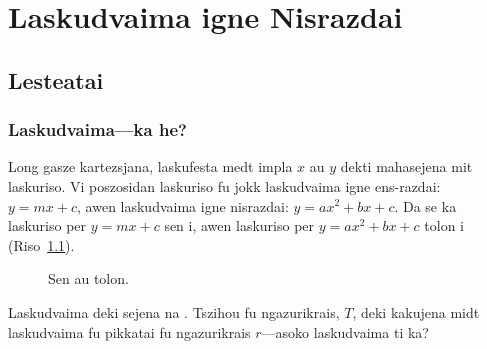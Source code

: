 \chapter{Laskudvaima igne Nisrazdai}

\section{Lesteatai}

\subsection{Laskudvaima---ka he?}

Long gasze kartezsjana, laskufesta medt impla \(x\) au \(y\) dekti mahasejena mit laskuriso.
Vi poszosidan laskuriso fu jokk laskudvaima igne ens-razdai: \(y = mx + c\), awen laskudvaima igne
nisrazdai: \(y = ax^2 + bx + c\). Da se ka laskuriso per \(y = mx + c\) sen i, awen laskuriso per
\(y = ax^2 + bx + c\) tolon i (Riso~\ref{fig:sen-au-tolon}).

\begin{figure}[htpb]
	\centering
	\hfill
	\hfill
	\hfill
	\caption{Sen au tolon.}
	\label{fig:sen-au-tolon}
\end{figure}

\begin{remark}
	Laskudvaima deki sejena na . Tszihou fu
	ngazurikrais, \(T\), deki kakujena midt laskudvaima fu pikkatai
	fu ngazurikrais \(r\)---asoko laskudvaima ti ka?
\end{remark}


